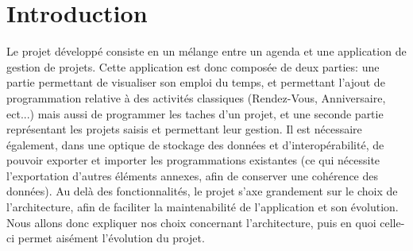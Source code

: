 \chapter{Introduction}
Le projet développé consiste en un mélange entre un agenda et une application de gestion de projets. Cette application est donc composée 
de deux parties: une partie permettant de visualiser son emploi du temps, et permettant l'ajout de programmation relative à des activités classiques (Rendez-Vous, Anniversaire, ect...) mais aussi de programmer les taches d'un projet, et une seconde partie représentant les projets 
saisis et permettant leur gestion. Il est nécessaire également, dans une optique de stockage des données et d'interopérabilité, de pouvoir exporter et importer les programmations existantes (ce qui nécessite l'exportation d'autres éléments annexes, afin de conserver une cohérence des données).
Au delà des fonctionnalités, le projet s'axe grandement sur le choix de l'architecture, afin de faciliter la maintenabilité de l'application et son évolution. Nous allons donc expliquer nos choix concernant l'architecture, puis en quoi celle-ci permet aisément l'évolution du projet.